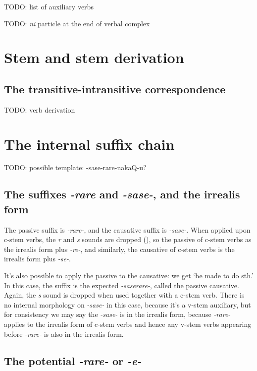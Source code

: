 \documentclass[UTF8, a4paper, oneside, scheme=plain]{ctexrep}
\newcommand{\corpus}[1]{\emph{#1}}
\newcommand{\translate}[1]{`#1'}
\begin{document}
TODO: list of auxiliary verbs

TODO: \corpus{ni} particle at the end of verbal complex

\section{Stem and stem derivation}\label{sec:verb-stem}

\subsection{The transitive-intransitive correspondence}

TODO: verb derivation

\section{The internal suffix chain}\label{sec:internal-suffix-chain}

TODO: possible template: -sase-rare-nakaQ-u?

\subsection{The suffixes \corpus{-rare} and \corpus{-sase-}, and the irrealis form}\label{sec:valency-irrealis}

The passive suffix is \corpus{-rare-},
and the causative suffix is \corpus{-sase-}.
When applied upon c-stem verbs,
the \corpus{r} and \corpus{s} sounds are dropped (),
so the passive of c-stem verbs as the irrealis form plus \corpus{-re-},
and similarly,
the causative of c-stem verbs is the irrealis form plus \corpus{-se-}.

It's also possible to apply the passive to the causative:
we get \translate{be made to do sth.}
In this case, the suffix is the expected 
\corpus{-saserare-},
called the passive causative.
Again, the \corpus{s} sound is dropped when used together with a c-stem verb.
There is no internal morphology on \corpus{-sase-} in this case,
because it's a v-stem auxiliary, but for consistency we may say
the \corpus{-sase-} is in the irrealis form,
because \corpus{-rare-} applies to the irrealis form of c-stem verbs 
and hence any v-stem verbs appearing before \corpus{-rare-} is also in the irrealis form.

\subsection{The potential \corpus{-rare-} or \corpus{-e-}}\label{sec:be-able-to-do}
\end{document}
